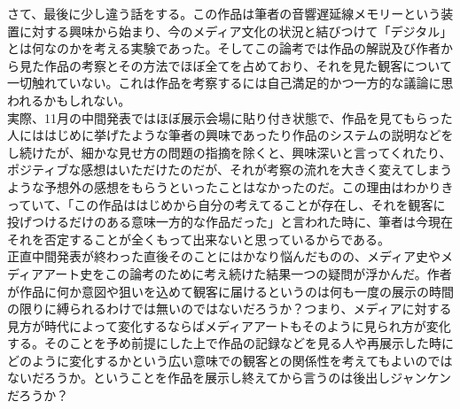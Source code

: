 \documentclass[a4paper,report]{jsbook}
\begin{document}
さて、最後に少し違う話をする。この作品は筆者の音響遅延線メモリーという装置に対する興味から始まり、今のメディア文化の状況と結びつけて「デジタル」とは何なのかを考える実験であった。そしてこの論考では作品の解説及び作者から見た作品の考察とその方法でほぼ全てを占めており、それを見た観客について一切触れていない。これは作品を考察するには自己満足的かつ一方的な議論に思われるかもしれない。\\
実際、11月の中間発表ではほぼ展示会場に貼り付き状態で、作品を見てもらった人にははじめに挙げたような筆者の興味であったり作品のシステムの説明などをし続けたが、細かな見せ方の問題の指摘を除くと、興味深いと言ってくれたり、ポジティブな感想はいただけたのだが、それが考察の流れを大きく変えてしまうような予想外の感想をもらうといったことはなかったのだ。この理由はわかりきっていて、「この作品ははじめから自分の考えてることが存在し、それを観客に投げつけるだけのある意味一方的な作品だった」と言われた時に、筆者は今現在それを否定することが全くもって出来ないと思っているからである。\\
正直中間発表が終わった直後そのことにはかなり悩んだものの、メディア史やメディアアート史をこの論考のために考え続けた結果一つの疑問が浮かんだ。作者が作品に何か意図や狙いを込めて観客に届けるというのは何も一度の展示の時間の限りに縛られるわけでは無いのではないだろうか？つまり、メディアに対する見方が時代によって変化するならばメディアアートもそのように見られ方が変化する。そのことを予め前提にした上で作品の記録などを見る人や再展示した時にどのように変化するかという広い意味での観客との関係性を考えてもよいのではないだろうか。ということを作品を展示し終えてから言うのは後出しジャンケンだろうか？
\end{document}
